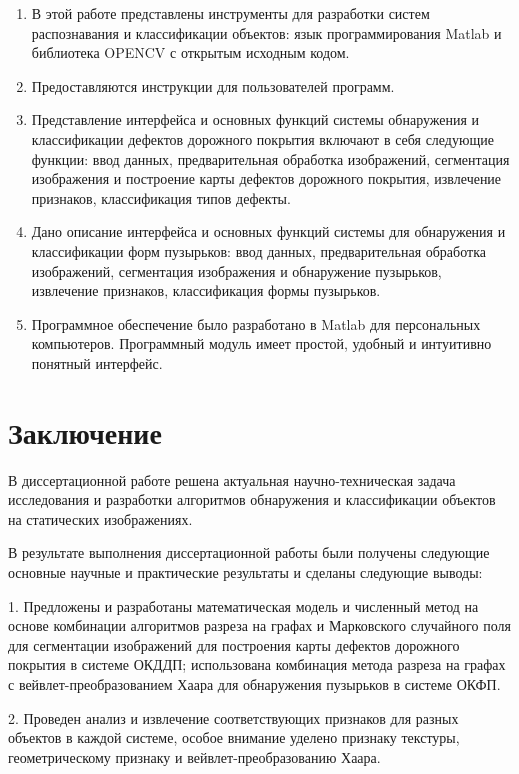 \documentclass[a4paper,14pt]{extreport}
\begin{document}
\begin{enumerate}
\item В этой работе представлены инструменты для разработки систем распознавания и классификации объектов: язык программирования Matlab и библиотека OPENCV с открытым исходным кодом.
\item Предоставляются инструкции для пользователей программ.
\item Представление интерфейса и основных функций системы обнаружения и классификации дефектов дорожного покрытия включают в себя следующие функции: ввод данных, предварительная обработка изображений, сегментация изображения и построение карты дефектов дорожного покрытия, извлечение признаков, классификация типов дефекты.
\item Дано описание интерфейса и основных функций системы для обнаружения и классификации форм пузырьков: ввод данных, предварительная обработка изображений, сегментация изображения и обнаружение пузырьков, извлечение признаков, классификация формы пузырьков.
\item Программное обеспечение было разработано в Matlab для персональных компьютеров. Программный модуль имеет простой, удобный и интуитивно понятный интерфейс.
\end{enumerate}


\chapter*{Заключение}
В диссертационной работе решена актуальная научно-техническая задача исследования и разработки алгоритмов обнаружения и классификации объектов на статических изображениях.

В результате выполнения диссертационной работы были получены следующие основные научные и практические результаты и сделаны следующие выводы:

1.	Предложены и разработаны математическая модель и численный метод на основе комбинации алгоритмов разреза на графах и Марковского случайного поля для сегментации изображений для построения карты дефектов дорожного покрытия в системе ОКДДП; использована комбинация метода разреза на графах с вейвлет-преобразованием Хаара для обнаружения пузырьков в системе ОКФП.

2.	Проведен анализ и извлечение соответствующих признаков для разных объектов в каждой системе, особое внимание уделено признаку текстуры, геометрическому признаку и вейвлет-преобразованию Хаара.
\end{document}
